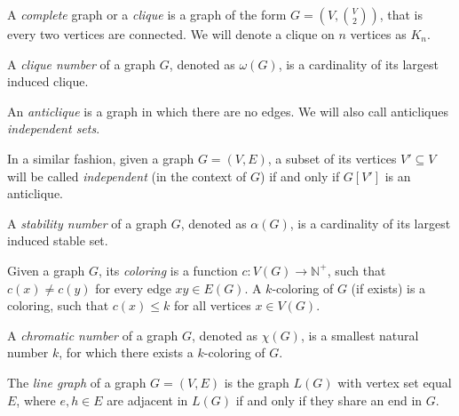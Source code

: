 \begin{defn}[clique]
  A \emph{complete} graph or a \emph{clique} is a graph of the form $G = (V, {V \choose 2})$, that is every two vertices are connected. We will denote a clique on $n$ vertices as $K_n$.
\end{defn}

\begin{defn}
  A \emph{clique number} of a graph $G$, denoted as $\omega(G)$, is a cardinality of its largest induced clique.
\end{defn}

\begin{defn}[anticlique]
  An \emph{anticlique} is a graph in which there are no edges. We will also call anticliques \emph{independent sets}. 
\end{defn}
In a similar fashion, given a graph $G = (V, E)$, a subset of its vertices $V' \subseteq V$ will be called \emph{independent} (in the context of $G$) if and only if $G[V']$ is an anticlique.

\begin{defn}
  A \emph{stability number} of a graph $G$, denoted as $\alpha(G)$, is a cardinality of its largest induced stable set.
\end{defn}

\begin{defn}[coloring]
  Given a graph $G$, its \emph{coloring} is a function $c: V(G) \rightarrow \mathbb{N}^+$, such that $c(x) \neq c(y)$ for every edge $xy \in E(G)$. A $k$-coloring of $G$ (if exists) is a coloring, such that $c(x) \leq k$ for all vertices $x \in V(G)$.
\end{defn}

\begin{defn}
  A \emph{chromatic number} of a graph $G$, denoted as $\chi(G)$, is a smallest natural number $k$, for which there exists a $k$-coloring of $G$.
\end{defn}

\begin{defn}
  The \emph{line graph} of a graph $G = (V, E)$ is the graph $L(G)$ with vertex set equal $E$, where $e, h \in E$ are adjacent in $L(G)$ if and only if they share an end in $G$.
\end{defn}


